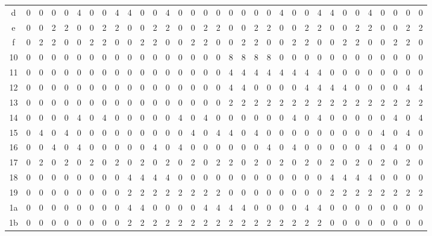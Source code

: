 \documentclass[11pt]{article}
\begin{document}
\begin{table}[htbp]
{\begin{tabular}{c|*{32}{c}}
    d & 0 & 0 & 0 & 0 & 4 & 0 & 0 & 4 & 4 & 0 & 0 & 4 & 0 & 0 & 0 & 0 & 0 & 0 & 0 & 0 & 4 & 0 & 0 & 4 & 4 & 0 & 0 & 4 & 0 & 0 & 0 & 0 \\
    e & 0 & 0 & 2 & 2 & 0 & 0 & 2 & 2 & 0 & 0 & 2 & 2 & 0 & 0 & 2 & 2 & 0 & 0 & 2 & 2 & 0 & 0 & 2 & 2 & 0 & 0 & 2 & 2 & 0 & 0 & 2 & 2 \\
    f & 0 & 2 & 2 & 0 & 0 & 2 & 2 & 0 & 0 & 2 & 2 & 0 & 0 & 2 & 2 & 0 & 0 & 2 & 2 & 0 & 0 & 2 & 2 & 0 & 0 & 2 & 2 & 0 & 0 & 2 & 2 & 0 \\
    10 & 0 & 0 & 0 & 0 & 0 & 0 & 0 & 0 & 0 & 0 & 0 & 0 & 0 & 0 & 0 & 0 & 8 & 8 & 8 & 8 & 0 & 0 & 0 & 0 & 0 & 0 & 0 & 0 & 0 & 0 & 0 & 0 \\
    11 & 0 & 0 & 0 & 0 & 0 & 0 & 0 & 0 & 0 & 0 & 0 & 0 & 0 & 0 & 0 & 0 & 4 & 4 & 4 & 4 & 4 & 4 & 4 & 4 & 0 & 0 & 0 & 0 & 0 & 0 & 0 & 0 \\
    12 & 0 & 0 & 0 & 0 & 0 & 0 & 0 & 0 & 0 & 0 & 0 & 0 & 0 & 0 & 0 & 0 & 4 & 4 & 0 & 0 & 0 & 0 & 4 & 4 & 4 & 4 & 0 & 0 & 0 & 0 & 4 & 4 \\
    13 & 0 & 0 & 0 & 0 & 0 & 0 & 0 & 0 & 0 & 0 & 0 & 0 & 0 & 0 & 0 & 0 & 2 & 2 & 2 & 2 & 2 & 2 & 2 & 2 & 2 & 2 & 2 & 2 & 2 & 2 & 2 & 2 \\
    14 & 0 & 0 & 0 & 0 & 4 & 0 & 4 & 0 & 0 & 0 & 0 & 0 & 4 & 0 & 4 & 0 & 0 & 0 & 0 & 0 & 0 & 4 & 0 & 4 & 0 & 0 & 0 & 0 & 0 & 4 & 0 & 4 \\
    15 & 0 & 4 & 0 & 4 & 0 & 0 & 0 & 0 & 0 & 0 & 0 & 0 & 0 & 4 & 0 & 4 & 4 & 0 & 4 & 0 & 0 & 0 & 0 & 0 & 0 & 0 & 0 & 0 & 4 & 0 & 4 & 0 \\
    16 & 0 & 0 & 4 & 0 & 4 & 0 & 0 & 0 & 0 & 0 & 4 & 0 & 4 & 0 & 0 & 0 & 0 & 0 & 0 & 4 & 0 & 4 & 0 & 0 & 0 & 0 & 0 & 4 & 0 & 4 & 0 & 0 \\
    17 & 0 & 2 & 0 & 2 & 0 & 2 & 0 & 2 & 0 & 2 & 0 & 2 & 0 & 2 & 0 & 2 & 2 & 0 & 2 & 0 & 2 & 0 & 2 & 0 & 2 & 0 & 2 & 0 & 2 & 0 & 2 & 0 \\
    18 & 0 & 0 & 0 & 0 & 0 & 0 & 0 & 0 & 4 & 4 & 4 & 4 & 0 & 0 & 0 & 0 & 0 & 0 & 0 & 0 & 0 & 0 & 0 & 0 & 4 & 4 & 4 & 4 & 0 & 0 & 0 & 0 \\
    19 & 0 & 0 & 0 & 0 & 0 & 0 & 0 & 0 & 2 & 2 & 2 & 2 & 2 & 2 & 2 & 2 & 0 & 0 & 0 & 0 & 0 & 0 & 0 & 0 & 2 & 2 & 2 & 2 & 2 & 2 & 2 & 2 \\
    1a & 0 & 0 & 0 & 0 & 0 & 0 & 0 & 0 & 4 & 4 & 0 & 0 & 0 & 0 & 4 & 4 & 4 & 4 & 0 & 0 & 0 & 0 & 4 & 4 & 0 & 0 & 0 & 0 & 0 & 0 & 0 & 0 \\
    1b & 0 & 0 & 0 & 0 & 0 & 0 & 0 & 0 & 2 & 2 & 2 & 2 & 2 & 2 & 2 & 2 & 2 & 2 & 2 & 2 & 2 & 2 & 2 & 2 & 0 & 0 & 0 & 0 & 0 & 0 & 0 & 0 \\

\end{tabular}}
\end{table}
\end{document}
